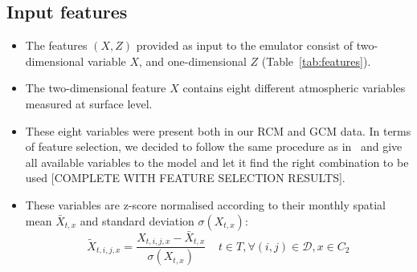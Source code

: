 \documentclass[a4paper,11pt,oneside]{report}
\begin{document}
\subsection{Input features}
\begin{itemize}
    \item The features $(X, Z)$ provided as input to the emulator consist of two-dimensional variable $X$, and one-dimensional $Z$ (Table~\ref{tab:features}). 
    \item The two-dimensional feature $X$ contains eight different atmospheric variables measured at surface level. \item These eight variables were present both in our RCM and GCM data. In terms of feature selection, we decided to follow the same procedure as in~\cite{Doury} and give all available variables to the model and let it find the right combination to be used [COMPLETE WITH FEATURE SELECTION RESULTS]. 
    \item These variables are z-score normalised according to their monthly spatial mean $\bar{X}_{t,x}$ and standard deviation $\sigma(X_{t,x})$:
    \begin{equation}\label{eq:normalisation-X}
    \tilde{X}_{t,i,j,x} = \frac{X_{t,i,j,x}-\bar{X}_{t,x}}{\sigma(X_{t,x})} \;\;\;\; t\in T, \forall (i,j) \in \mathcal{D}, x\in C_2
\end{equation}


\end{itemize}
\end{document}
